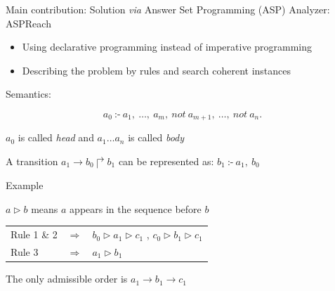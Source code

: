 \documentclass[8pt]{beamer}
\begin{document}
\begin{frame}{Main contribution: Solution \textit{via} Answer Set Programming (ASP)}
Analyzer: ASPReach
\begin{itemize}
    \item Using declarative programming instead of imperative programming
    \item Describing the problem by rules and search coherent instances 
\end{itemize}

Semantics:

$$a_0\ \text{:-}\ a_1 ,\ \ldots,\ a_m,\ not\ a_{m+1},\ \ldots ,\ not\ a_n.$$    

$a_0$ is called \textit{head} and $a_1\ldots a_n$ is called \textit{body}

A transition $a_1\to b_0\Rsh b_1$ can be represented as: $b_1\ \text{:-}\ a_1,\ b_0$
\end{frame}

\begin{frame}{Example}
\begin{figure}

\end{figure}
\begin{figure}

\end{figure}
$a\rhd b$ means $a$ appears in the sequence before $b$
\begin{tabular}{lll}
Rule 1 \& 2 &$\Rightarrow$& $b_0\rhd a_1\rhd c_1$ , $c_0 \rhd b_1\rhd c_1$\\
Rule 3 &$\Rightarrow$& $a_1 \rhd b_1$
\end{tabular}


The only admissible order is $a_1\to b_1\to c_1$
\end{frame}
\end{document}
